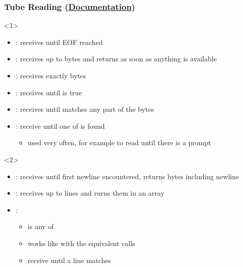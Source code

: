 \documentclass[aspectratio=169]{beamer}
\newcommand{\docl}[1]{(\textbf{\href{#1}{Documentation}})}
\begin{document}
{\begin{frame}[fragile]
    \frametitle{Tube Reading \docl{http://docs.pwntools.com/en/stable/tubes.html\#pwnlib.tubes.tube.tube.recv}}
    \begin{onlyenv}<1>
        \begin{itemize}
            \item {}: receives until EOF reached
            \item {}: receives up to  bytes and returns as soon as anything is available
            \item {}: receives exactly  bytes
            \item {}: receives until  is true
            \item {}: receives until  matches any part of the bytes
            \item {}: receive until one of  is found
            \begin{itemize}
                \item used very often, for example to read until there is a prompt
            \end{itemize}
        \end{itemize}
    \end{onlyenv}
    \begin{onlyenv}<2>
        \begin{itemize}
            \item {}: receives until first newline encountered, returns bytes including newline
            \item {}: receives up to  lines and rurns them in an array
            \item {}:
            \begin{itemize}
                \item {} is any of 
                \item {} works like with the equivalent  calls
                \item {} receive until a line matches

\end{itemize}
\end{itemize}
\end{onlyenv}
\end{frame}}
\end{document}
